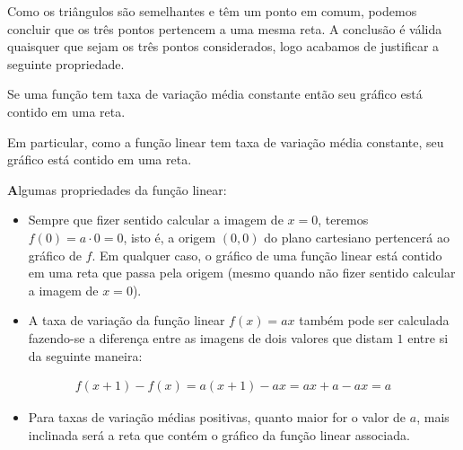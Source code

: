 Como os triângulos são semelhantes e têm um ponto em comum, podemos concluir que os três pontos pertencem a uma mesma reta. A conclusão é válida quaisquer que sejam os três pontos considerados, logo acabamos de justificar a seguinte propriedade.

\begin{observation}{}
Se uma função tem taxa de variação média constante então seu gráfico está contido em uma reta.

Em particular, como a função linear tem taxa de variação média constante, seu gráfico está contido em uma reta.
\end{observation}
\begin{observation}{}
{\textbf Algumas propriedades da função linear:}
\begin{itemize}
\item {} 
Sempre que fizer sentido calcular a imagem de \(x=0\), teremos \(f(0)=a \cdot 0 = 0\), isto é, a origem \((0,0)\) do plano cartesiano pertencerá ao gráfico de \(f\). Em qualquer caso, o gráfico de uma função linear está contido em uma reta que passa pela origem (mesmo quando não fizer sentido calcular a imagem de \(x=0\)).

\item {} 
A taxa de variação da função linear \(f(x)=ax\) também pode ser calculada fazendo-se a diferença entre as imagens de dois valores que distam \(1\) entre si da seguinte maneira:

\end{itemize}
\begin{equation*}
\begin{split}f(x+1)-f(x)=a(x+1)-ax=ax+a-ax=a\end{split}
\end{equation*}\begin{center}\end{center}\begin{itemize}
\item {} 
Para taxas de variação médias positivas, quanto maior for o valor de \(a\), mais inclinada será a reta que contém o gráfico da função linear associada.


\end{itemize}
\end{observation}
